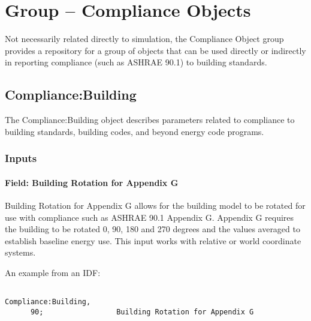 \section{Group -- Compliance Objects}\label{group-compliance-objects}

Not necessarily related directly to simulation, the Compliance Object group provides a repository for a group of objects that can be used directly or indirectly in reporting compliance (such as ASHRAE 90.1) to building standards.

\subsection{Compliance:Building}\label{compliancebuilding}

The Compliance:Building object describes parameters related to compliance to building standards, building codes, and beyond energy code programs.

\subsubsection{Inputs}\label{inputs-006}

\paragraph{Field: Building Rotation for Appendix G}\label{field-building-rotation-for-appendix-g}

Building Rotation for Appendix G allows for the building model to be rotated for use with compliance such as ASHRAE 90.1 Appendix G. Appendix G requires the building to be rotated 0, 90, 180 and 270 degrees and the values averaged to establish baseline energy use. This input works with relative or world coordinate systems.

An example from an IDF:

\begin{lstlisting}

Compliance:Building,
      90;                 Building Rotation for Appendix G
\end{lstlisting}
